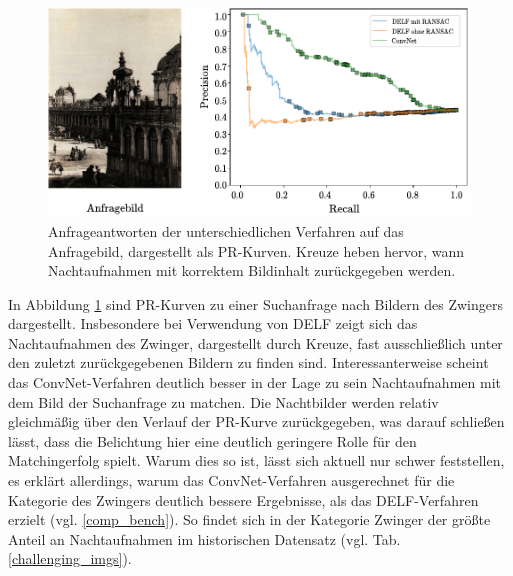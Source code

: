 \begin{figure}[h]
\centering
\includegraphics[scale=1.0]{night_pr}
\caption{Anfrageantworten der unterschiedlichen Verfahren auf das Anfragebild, dargestellt als PR-Kurven. Kreuze heben hervor, wann Nachtaufnahmen mit korrektem Bildinhalt zurückgegeben werden.}
\label{night_pr}
\end{figure}
In Abbildung \ref{night_pr} sind PR-Kurven zu einer Suchanfrage nach Bildern des Zwingers dargestellt. Insbesondere bei Verwendung von DELF zeigt sich das Nachtaufnahmen des Zwinger, dargestellt durch Kreuze, fast ausschließlich unter den zuletzt zurückgegebenen Bildern zu finden sind. Interessanterweise scheint das ConvNet-Verfahren deutlich besser in der Lage zu sein Nachtaufnahmen mit dem Bild der Suchanfrage zu matchen. Die Nachtbilder werden relativ gleichmäßig über den Verlauf der PR-Kurve zurückgegeben, was darauf schließen lässt, dass die Belichtung hier eine deutlich geringere Rolle für den Matchingerfolg spielt. Warum dies so ist, lässt sich aktuell nur schwer feststellen, es erklärt allerdings, warum das ConvNet-Verfahren ausgerechnet für die Kategorie des Zwingers deutlich bessere Ergebnisse, als das DELF-Verfahren erzielt (vgl. \ref{comp_bench}). So findet sich in der Kategorie Zwinger der größte Anteil an Nachtaufnahmen im historischen Datensatz (vgl. Tab. \ref{challenging_imgs}).
\begin{table}[h]
\caption{Anteil an Objektdarstellungen im historischen Datensatz, die unterschiedliche erschwerenden Besonderheiten vorweisen.}
\label{challenging_imgs}
\end{table}
